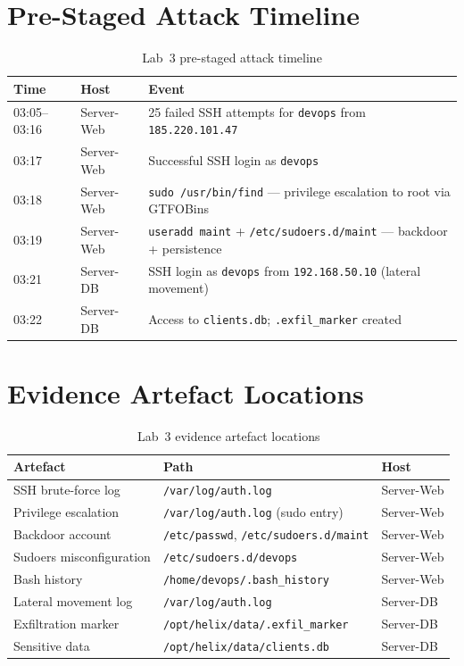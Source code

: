 \section*{Pre-Staged Attack Timeline}

\begin{table}[H]
\centering
\small
\begin{tabularx}{\textwidth}{llX}
\toprule
\textbf{Time} & \textbf{Host} & \textbf{Event} \\
\midrule
03:05--03:16 & Server-Web & 25 failed SSH attempts for \texttt{devops} from \texttt{185.220.101.47} \\
03:17        & Server-Web & Successful SSH login as \texttt{devops} \\
03:18        & Server-Web & \texttt{sudo /usr/bin/find} --- privilege escalation to root via GTFOBins \\
03:19        & Server-Web & \texttt{useradd maint} + \texttt{/etc/sudoers.d/maint} --- backdoor + persistence \\
03:21        & Server-DB  & SSH login as \texttt{devops} from \texttt{192.168.50.10} (lateral movement) \\
03:22        & Server-DB  & Access to \texttt{clients.db}; \texttt{.exfil\_marker} created \\
\bottomrule
\end{tabularx}
\caption{Lab~3 pre-staged attack timeline}
\label{tab:lab3-timeline}
\end{table}

\section*{Evidence Artefact Locations}

\begin{table}[H]
\centering
\begin{tabularx}{\textwidth}{lXl}
\toprule
\textbf{Artefact} & \textbf{Path} & \textbf{Host} \\
\midrule
SSH brute-force log    & \texttt{/var/log/auth.log}                  & Server-Web \\
Privilege escalation   & \texttt{/var/log/auth.log} (sudo entry)     & Server-Web \\
Backdoor account       & \texttt{/etc/passwd}, \texttt{/etc/sudoers.d/maint} & Server-Web \\
Sudoers misconfiguration & \texttt{/etc/sudoers.d/devops}            & Server-Web \\
Bash history           & \texttt{/home/devops/.bash\_history}        & Server-Web \\
Lateral movement log   & \texttt{/var/log/auth.log}                  & Server-DB \\
Exfiltration marker    & \texttt{/opt/helix/data/.exfil\_marker}     & Server-DB \\
Sensitive data         & \texttt{/opt/helix/data/clients.db}         & Server-DB \\
\bottomrule
\end{tabularx}
\caption{Lab~3 evidence artefact locations}
\label{tab:lab3-artefacts}
\end{table}

